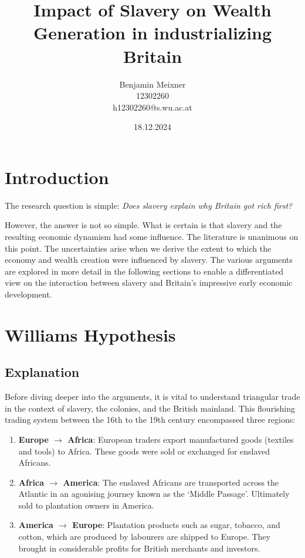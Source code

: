 \documentclass[a4paper,11pt]{article}
\begin{document}
\title{Impact of Slavery on Wealth Generation in industrializing Britain}
\author{Benjamin Meixner \\ 12302260 \\ h12302260@s.wu.ac.at}
\date{18.12.2024} %
\maketitle

\pagebreak

\tableofcontents

\pagebreak

\section*{Introduction}

The research question is simple: \qquad \textit{Does slavery explain why Britain got rich first?}

However, the answer is not so simple. What is certain is that slavery and the resulting economic dynamism had some influence. The literature is unanimous on this point. The uncertainties arise when we derive the extent to which the economy and wealth creation were influenced by slavery. The various arguments are explored in more detail in the following sections to enable a differentiated view on the interaction between slavery and Britain's impressive early economic development.

\section{Williams Hypothesis}
\subsection{Explanation}

Before diving deeper into the arguments, it is vital to understand triangular trade in the context of slavery, the colonies, and the British mainland. This flourishing trading system between the 16th to the 19th century encompassed three regions:

\begin{enumerate}
    \itemsep0em
    \item \textbf{Europe $\rightarrow$ Africa}: European traders export manufactured goods (textiles and tools) to Africa. These goods were sold or exchanged for enslaved Africans.

    \item \textbf{Africa $\rightarrow$ America}: The enslaved Africans are transported across the Atlantic in an agonising journey known as the ‘Middle Passage’. Ultimately sold to plantation owners in America.

    \item \textbf{America $\rightarrow$ Europe}: Plantation products such as sugar, tobacco, and cotton, which are produced by labourers are shipped to Europe. They brought in considerable profits for British merchants and investors.
\end{enumerate}
\end{document}
